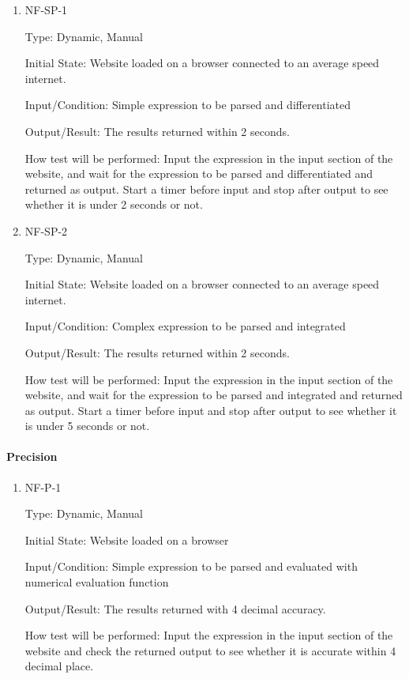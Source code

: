 \documentclass[12pt, titlepage]{article}
\begin{document}
\begin{enumerate}

\item{NF-SP-1}

Type: Dynamic, Manual
					
Initial State: Website loaded on a browser connected to an average speed internet. 
					
Input/Condition: Simple expression to be parsed and differentiated
					
Output/Result: The results returned within 2 seconds.
					
How test will be performed: Input the expression in the input section of the website, and wait for the expression to be parsed and differentiated and returned as output. Start a timer before input and stop after output to see whether it is under 2 seconds or not.

              


\item{NF-SP-2}

Type: Dynamic, Manual
					
Initial State: Website loaded on a browser connected to an average speed internet. 
					
Input/Condition: Complex expression to be parsed and integrated
					
Output/Result: The results returned within 2 seconds.
					
How test will be performed: Input the expression in the input section of the website, and wait for the expression to be parsed and integrated and returned as output. Start a timer before input and stop after output to see whether it is under 5 seconds or not.
\end{enumerate}

\paragraph{Precision}

\begin{enumerate}

\item{NF-P-1}

Type: Dynamic, Manual
					
Initial State: Website loaded on a browser 
					
Input/Condition: Simple expression to be parsed and evaluated with numerical evaluation function
					
Output/Result: The results returned with 4 decimal accuracy.
					
How test will be performed: Input the expression in the input section of the website and check the returned output to see whether it is accurate within 4 decimal place. 
\end{enumerate}
\end{document}

